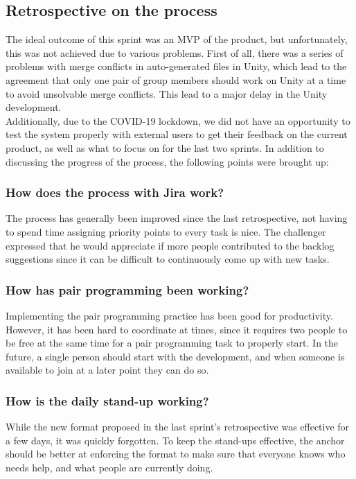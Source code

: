 \subsection{Retrospective on the process}
The ideal outcome of this sprint was an MVP of the product, but unfortunately, this was not achieved due to various problems.
First of all, there was a series of problems with merge conflicts in auto-generated files in Unity, which lead to the agreement that only one pair of group members should work on Unity at a time to avoid unsolvable merge conflicts.
This lead to a major delay in the Unity development.\\
Additionally, due to the COVID-19 lockdown, we did not have an opportunity to test the system properly with external users to get their feedback on the current product, as well as what to focus on for the last two sprints.
In addition to discussing the progress of the process, the following points were brought up:

\subsubsection*{How does the process with Jira work?}
The process has generally been improved since the last retrospective, not having to spend time assigning priority points to every task is nice.
The challenger expressed that he would appreciate if more people contributed to the backlog suggestions since it can be difficult to continuously come up with new tasks.


\subsubsection*{How has pair programming been working?}
Implementing the pair programming practice has been good for productivity.
However, it has been hard to coordinate at times, since it requires two people to be free at the same time for a pair programming task to properly start.
In the future, a single person should start with the development, and when someone is available to join at a later point they can do so.

\subsubsection*{How is the daily stand-up working?}
While the new format proposed in the last sprint's retrospective was effective for a few days, it was quickly forgotten.
To keep the stand-ups effective, the anchor should be better at enforcing the format to make sure that everyone knows who needs help, and what people are currently doing.

